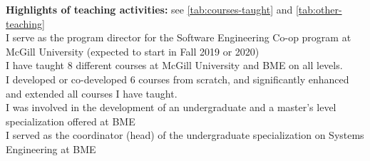 \documentclass{xetexCV}
\begin{document}


\clearpage


\textbf{Highlights of teaching activities:} see \autoref{tab:courses-taught} and \autoref{tab:other-teaching}\\ 
I serve as the program director for the Software Engineering Co-op program at McGill University (expected to start in Fall 2019 or 2020) \\
I have taught 8 different courses at McGill University and BME on all levels. \\
I developed or co-developed 6 courses from scratch, and significantly enhanced and extended all courses I have taught. \\
I was involved in the development of an undergraduate and a master's level specialization offered at BME \\
I served as the coordinator (head) of the undergraduate specialization on Systems Engineering at BME\\
\end{document}

